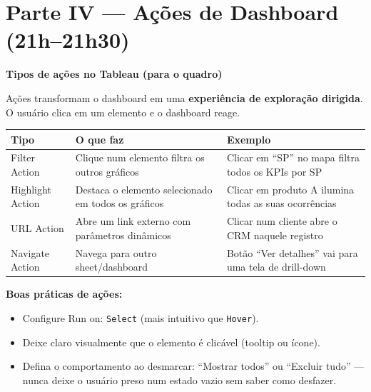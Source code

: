 \section{Parte IV — Ações de Dashboard (21h–21h30)}

\begin{BoardBox}
\textbf{Tipos de ações no Tableau (para o quadro)}

Ações transformam o dashboard em uma \textbf{experiência de exploração dirigida}.
O usuário clica em um elemento e o dashboard reage.

\begin{tabular}{|l|p{5.5cm}|p{4.5cm}|}
\hline
\textbf{Tipo} & \textbf{O que faz} & \textbf{Exemplo} \\
\hline
Filter Action & Clique num elemento filtra os outros gráficos & Clicar em ``SP'' no mapa filtra todos os KPIs por SP \\
Highlight Action & Destaca o elemento selecionado em todos os gráficos & Clicar em produto A ilumina todas as suas ocorrências \\
URL Action & Abre um link externo com parâmetros dinâmicos & Clicar num cliente abre o CRM naquele registro \\
Navigate Action & Navega para outro sheet/dashboard & Botão ``Ver detalhes'' vai para uma tela de drill-down \\
\hline
\end{tabular}

\textbf{Boas práticas de ações:}
\begin{itemize}
  \item Configure Run on: \texttt{Select} (mais intuitivo que \texttt{Hover}).
  \item Deixe claro visualmente que o elemento é clicável (tooltip ou ícone).
  \item Defina o comportamento ao desmarcar: ``Mostrar todos'' ou ``Excluir tudo''
  — nunca deixe o usuário preso num estado vazio sem saber como desfazer.
\end{itemize}
\end{BoardBox}

